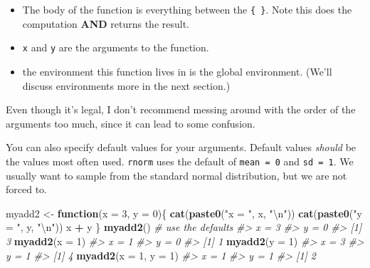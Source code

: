 \documentclass[]{book}
\newenvironment{Shaded}{\begin{snugshade}}{\end{snugshade}}
\newcommand{\CharTok}[1]{\textcolor[rgb]{0.31,0.60,0.02}{#1}}
\newcommand{\CommentTok}[1]{\textcolor[rgb]{0.56,0.35,0.01}{\textit{#1}}}
\newcommand{\ControlFlowTok}[1]{\textcolor[rgb]{0.13,0.29,0.53}{\textbf{#1}}}
\newcommand{\DataTypeTok}[1]{\textcolor[rgb]{0.13,0.29,0.53}{#1}}
\newcommand{\DecValTok}[1]{\textcolor[rgb]{0.00,0.00,0.81}{#1}}
\newcommand{\KeywordTok}[1]{\textcolor[rgb]{0.13,0.29,0.53}{\textbf{#1}}}
\newcommand{\NormalTok}[1]{#1}
\newcommand{\OperatorTok}[1]{\textcolor[rgb]{0.81,0.36,0.00}{\textbf{#1}}}
\newcommand{\StringTok}[1]{\textcolor[rgb]{0.31,0.60,0.02}{#1}}
\providecommand{\tightlist}{%
  \setlength{\itemsep}{0pt}\setlength{\parskip}{0pt}}
\theoremstyle{definition}
\theoremstyle{definition}
\theoremstyle{definition}
\theoremstyle{remark}
\let\BeginKnitrBlock\begin \let\EndKnitrBlock\end
\begin{document}
\begin{itemize}
\tightlist
\item
  The body of the function is everything between the \texttt{\{\ \}}.
  Note this does the computation \textbf{AND} returns the result.
\item
  \texttt{x} and \texttt{y} are the arguments to the function.
\item
  the environment this function lives in is the global environment.
  (We'll discuss environments more in the next section.)
\end{itemize}

\BeginKnitrBlock{rmdtip}
Even though it's legal, I don't recommend messing around with the order
of the arguments too much, since it can lead to some confusion.
\EndKnitrBlock{rmdtip}

You can also specify default values for your arguments. Default values
\emph{should} be the values most often used. \texttt{rnorm} uses the
default of \texttt{mean\ =\ 0} and \texttt{sd\ =\ 1}. We usually want to
sample from the standard normal distribution, but we are not forced to.

\begin{Shaded}
\begin{Highlighting}[]
\NormalTok{myadd2 <-}\StringTok{ }\ControlFlowTok{function}\NormalTok{(}\DataTypeTok{x =} \DecValTok{3}\NormalTok{, }\DataTypeTok{y =} \DecValTok{0}\NormalTok{)\{}
  \KeywordTok{cat}\NormalTok{(}\KeywordTok{paste0}\NormalTok{(}\StringTok{"x = "}\NormalTok{, x, }\StringTok{"}\CharTok{\textbackslash{}n}\StringTok{"}\NormalTok{))}
  \KeywordTok{cat}\NormalTok{(}\KeywordTok{paste0}\NormalTok{(}\StringTok{"y = "}\NormalTok{, y, }\StringTok{"}\CharTok{\textbackslash{}n}\StringTok{"}\NormalTok{))}
\NormalTok{  x }\OperatorTok{+}\StringTok{ }\NormalTok{y}
\NormalTok{\}}
\KeywordTok{myadd2}\NormalTok{()              }\CommentTok{# use the defaults}
\CommentTok{#> x = 3}
\CommentTok{#> y = 0}
\CommentTok{#> [1] 3}
\KeywordTok{myadd2}\NormalTok{(}\DataTypeTok{x =} \DecValTok{1}\NormalTok{)}
\CommentTok{#> x = 1}
\CommentTok{#> y = 0}
\CommentTok{#> [1] 1}
\KeywordTok{myadd2}\NormalTok{(}\DataTypeTok{y =} \DecValTok{1}\NormalTok{)}
\CommentTok{#> x = 3}
\CommentTok{#> y = 1}
\CommentTok{#> [1] 4}
\KeywordTok{myadd2}\NormalTok{(}\DataTypeTok{x =} \DecValTok{1}\NormalTok{, }\DataTypeTok{y =} \DecValTok{1}\NormalTok{)}
\CommentTok{#> x = 1}
\CommentTok{#> y = 1}
\CommentTok{#> [1] 2}
\end{Highlighting}
\end{Shaded}
\end{document}
